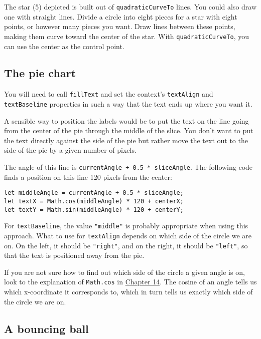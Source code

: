 The star (5) depicted is built out of \lstinline`quadraticCurveTo` lines. You could also draw one with straight lines. Divide a circle into eight pieces for a star with eight points, or however many pieces you want. Draw lines between these points, making them curve toward the center of the star. With \lstinline`quadraticCurveTo`, you can use the center as the control point.

\subsection{The pie chart}

You will need to call \lstinline`fillText` and set the context's \lstinline`textAlign` and \lstinline`textBaseline` properties in such a way that the text ends up where you want it.

A sensible way to position the labels would be to put the text on the line going from the center of the pie through the middle of the slice. You don't want to put the text directly against the side of the pie but rather move the text out to the side of the pie by a given number of pixels.

The angle of this line is \lstinline`currentAngle + 0.5 * sliceAngle`. The following code finds a position on this line 120 pixels from the center:

\begin{lstlisting}
let middleAngle = currentAngle + 0.5 * sliceAngle;
let textX = Math.cos(middleAngle) * 120 + centerX;
let textY = Math.sin(middleAngle) * 120 + centerY;
\end{lstlisting}
\noindent

For \lstinline`textBaseline`, the value \lstinline`"middle"` is probably appropriate when using this approach. What to use for \lstinline`textAlign` depends on which side of the circle we are on. On the left, it should be \lstinline`"right"`, and on the right, it should be \lstinline`"left"`, so that the text is positioned away from the pie.

If you are not sure how to find out which side of the circle a given angle is on, look to the explanation of \lstinline`Math.cos` in \hyperref[dom.sin_cos]{Chapter 14}. The cosine of an angle tells us which x-coordinate it corresponds to, which in turn tells us exactly which side of the circle we are on.

\subsection{A bouncing ball}


